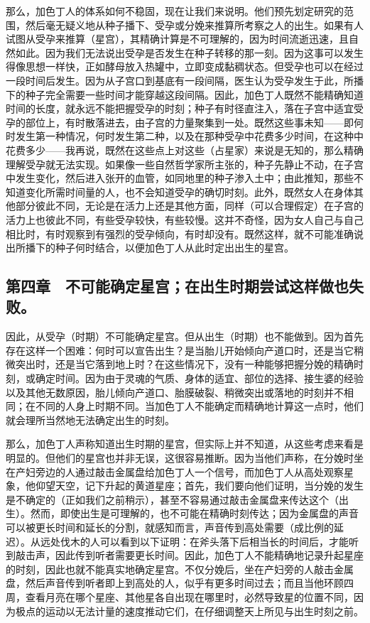 那么，加色丁人的体系如何不稳固，现在让我们来说明。他们预先划定研究的范围，然后毫无疑义地从种子播下、受孕或分娩来推算所考察之人的出生。如果有人试图从受孕来推算（星宫），其精确计算是不可理解的，因为时间流逝迅速，且自然如此。因为我们无法说出受孕是否发生在种子转移的那一刻。因为这事可以发生得像思想一样快，正如酵母放入热罐中，立即变成黏稠状态。但受孕也可以在经过一段时间后发生。因为从子宫口到基底有一段间隔，医生认为受孕发生于此，所播下的种子完全需要一些时间才能穿越这段间隔。因此，加色丁人既然不能精确知道时间的长度，就永远不能把握受孕的时刻；种子有时径直注入，落在子宫中适宜受孕的部位上，有时散落进去，由子宫的力量聚集到一处。既然这些事未知——即何时发生第一种情况，何时发生第二种，以及在那种受孕中花费多少时间，在这种中花费多少——我再说，既然在这些点上对这些（占星家）来说是无知的，那么精确理解受孕就无法实现。如果像一些自然哲学家所主张的，种子先静止不动，在子宫中发生变化，然后进入张开的血管，如同地里的种子渗入土中；由此推知，那些不知道变化所需时间量的人，也不会知道受孕的确切时刻。此外，既然女人在身体其他部分彼此不同，无论是在活力上还是其他方面，同样（可以合理假定）在子宫的活力上也彼此不同，有些受孕较快，有些较慢。这并不奇怪，因为女人自己与自己相比时，有时观察到有强烈的受孕倾向，有时却没有。既然这样，就不可能准确说出所播下的种子何时结合，以便加色丁人从此时定出出生的星宫。\par


\subsection{第四章　不可能确定星宫；在出生时期尝试这样做也失败。}

因此，从受孕（时期）不可能确定星宫。但从出生（时期）也不能做到。因为首先存在这样一个困难：何时可以宣告出生？是当胎儿开始倾向产道口时，还是当它稍微突出时，还是当它落到地上时？在这些情况下，没有一种能够把握分娩的精确时刻，或确定时间。因为由于灵魂的气质、身体的适宜、部位的选择、接生婆的经验以及其他无数原因，胎儿倾向产道口、胎膜破裂、稍微突出或落地的时刻并不相同；在不同的人身上时期不同。当加色丁人不能确定而精确地计算这一点时，他们就会理所当然地无法确定出生的时刻。\par

那么，加色丁人声称知道出生时期的星宫，但实际上并不知道，从这些考虑来看是明显的。但他们的星宫也并非无误，这很容易推断。因为当他们声称，在分娩时坐在产妇旁边的人通过敲击金属盘给加色丁人一个信号，而加色丁人从高处观察星象，他仰望天空，记下升起的黄道星座；首先，我们要向他们证明，当分娩的发生是不确定的（正如我们之前稍示），甚至不容易通过敲击金属盘来传达这个（出生）。然而，即使出生是可理解的，也不可能在精确时刻传达；因为金属盘的声音可以被更长时间和延长的分割，就感知而言，声音传到高处需要（成比例的延迟）。从远处伐木的人可以看到以下证明：在斧头落下后相当长的时间后，才能听到敲击声，因此传到听者需要更长时间。因此，加色丁人不能精确地记录升起星座的时刻，因此也就不能真实地确定星宫。不仅分娩后，坐在产妇旁的人敲击金属盘，然后声音传到听者即上到高处的人，似乎有更多时间过去；而且当他环顾四周，查看月亮在哪个星座、其他星各自出现在哪里时，必然导致星的位置不同，因为极点的运动以无法计量的速度推动它们，在仔细调整天上所见与出生时刻之前。\par


